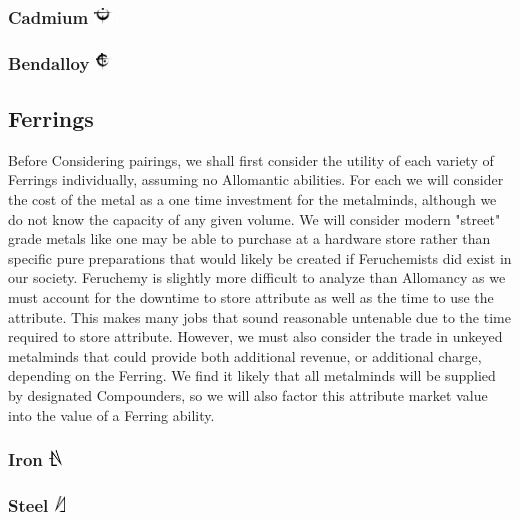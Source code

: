 \documentclass[conference]{IEEEtran}
\begin{document}
	\subsubsection{\textbf{Cadmium}        \includegraphics[height=1em]{images/Cadmium.png}}\label{sec:mistings:cadmium}
	\subsubsection{\textbf{Bendalloy}        \includegraphics[height=1em]{images/Bendalloy.png}}\label{sec:mistings:bendalloy}
\subsection{\textbf{Ferrings}}
Before Considering pairings, we shall first consider the utility of each variety of Ferrings individually, assuming no Allomantic abilities.  For each we will consider the cost of the metal as a one time investment for the metalminds, although we do not know the capacity of any given volume.  We will consider modern "street" grade metals like one may be able to purchase at a hardware store rather than specific pure preparations that would likely be created if Feruchemists did exist in our society.
Feruchemy is slightly more difficult to analyze than Allomancy as we must account for the downtime to store attribute as well as the time to use the attribute.  This makes many jobs that sound reasonable untenable due to the time required to store attribute.  However, we must also consider the trade in unkeyed metalminds that could provide both additional revenue, or additional charge, depending on the Ferring.  We find it likely that all metalminds will be supplied by designated Compounders, so we will also factor this attribute market value into the value of a Ferring ability.
    \subsubsection{\textbf{Iron}    \includegraphics[height=1em]{images/Iron_(Feruchemy).png}}\label{sec:ferrings:iron}
	\subsubsection{\textbf{Steel}    \includegraphics[height=1em]{images/Steel_(Feruchemy).png}}\label{sec:ferrings:steel}
\end{document}
